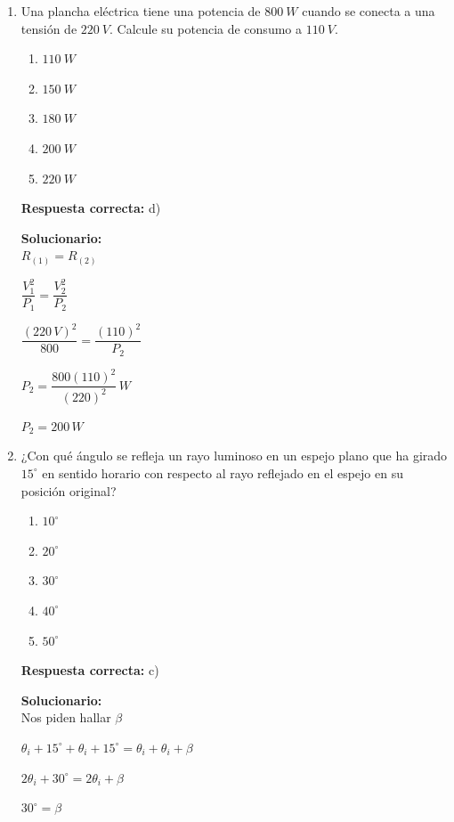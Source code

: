 \begin{enumerate}
	$Q_t=Q_f+Q$
	
	$\Rightarrow L_f\,m+mc\,(T_f-T_i)$
	
	$\Rightarrow \left(80\dfrac{\text{cal}}{g}\right)(500\,g)+\left(500\,g\right)\left(1\dfrac{\text{cal}}{g^\circ C}\right)(20-0)^\circ C$
	
	$\Rightarrow (40000+10000)\,\text{cal}$
	
	$=50000\,\text{cal}=50\,\text{kcal}$
	
	\vspace{6mm}
	
	\item Una plancha eléctrica tiene una potencia de $800\ W$ cuando se conecta a una tensión de $220\ V$. Calcule su potencia de consumo a $110\ V$.
	
	\begin{enumerate}[label=\alph*)]
		\item $110\ W$
		\item $150\ W$
		\item $180\ W$
		\item $200\ W$
		\item $220\ W$
	\end{enumerate}
	\textbf{Respuesta correcta:} d)
	
	\vspace{2mm}
	\textbf{Solucionario:}\\
	
	$R_{(1)}=R_{(2)}$
	
	$\dfrac{V_1^2}{P_1}=\dfrac{V_2^2}{P_2}$
	
	$\dfrac{(220\,V)^2}{800}=\dfrac{(110)^2}{P_2}$
	
	$P_2=\dfrac{800(110)^2}{(220)^2}\,W$
	
	$P_2=200\,W$
	
	\vspace{6mm}
	
	\item ¿Con qué ángulo se refleja un rayo luminoso en un espejo plano que ha girado $15^\circ$ en sentido horario con respecto al rayo reflejado en el espejo en su posición original?
	
	\begin{enumerate}[label=\alph*)]
		\item $10^\circ$
		\item $20^\circ$
		\item $30^\circ$
		\item $40^\circ$
		\item $50^\circ$
	\end{enumerate}
	\textbf{Respuesta correcta:} c)
	
	\vspace{2mm}
	\textbf{Solucionario:}\\
	
	Nos piden hallar $\beta$
	
	$\theta_i+15^\circ+\theta_i+15^\circ=\theta_i+\theta_i+\beta$
	
	$2\theta_i+30^\circ=2\theta_i+\beta$
	
	$30^\circ=\beta$
	
	\vspace{6mm}
	
\end{enumerate}
